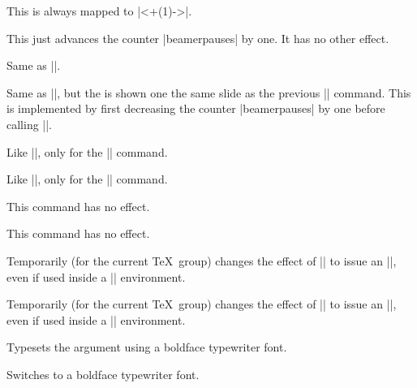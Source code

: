 \begin{command}{\bstep{}}
  This is always mapped to |\uncover<+(1)->|.
\end{command}

\begin{command}{\dstep}
  This just advances the counter |beamerpauses| by one. It has no other effect.
\end{command}

\begin{command}{\vstep}
  Same as |\dstep|.
\end{command}

\begin{command}{\restep{}}
  Same as |\step|, but the  is shown one the same slide as the previous |\step| command. This is implemented by first decreasing the counter |beamerpauses| by one before calling |\step|.
\end{command}

\begin{command}{\reswitch{}}
  Like |\restep|, only for the |\switch| command.
\end{command}

\begin{command}{\rebstep{}}
  Like |\restep|, only for the |\bstep| command.
\end{command}

\begin{command}{\redstep}
  This command has no effect.
\end{command}

\begin{command}{\revstep}
  This command has no effect.
\end{command}

\begin{command}{\boxedsteps}
  Temporarily (for the current \TeX\ group) changes the effect of |\step| to issue an |\uncover|, even if used inside a |\stepwise| environment.
\end{command}

\begin{command}{\nonboxedsteps}
  Temporarily (for the current \TeX\ group) changes the effect of |\step| to issue an |\only|, even if used inside a |\parstepwise| environment.
\end{command}

\begin{command}{\code{}}
  Typesets the argument using a boldface typewriter font.
\end{command}

\begin{command}{\codeswitch}
  Switches to a boldface typewriter font.
\end{command}
